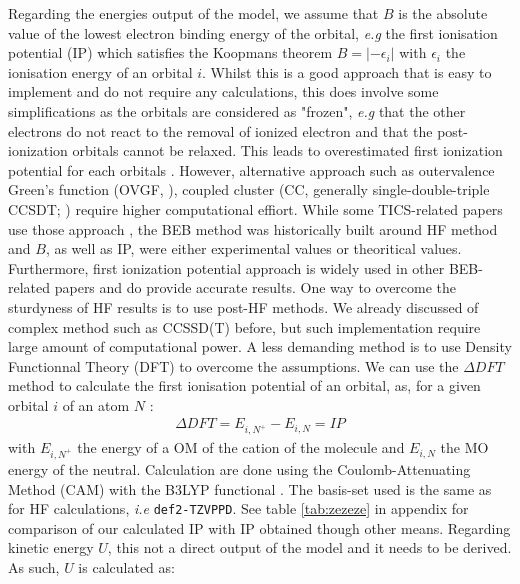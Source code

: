 \documentclass[twocolumn, a4paper, twoside,10pt]{scrartcl}
\begin{document}
Regarding the energies output of the model, we assume that $B$ is the absolute value of the lowest electron binding energy of the orbital, \textit{e.g} the first ionisation potential (IP) which satisfies the Koopmans theorem \citep{koopmansUberZuordnungWellenfunktionen1934} $B = |-\epsilon_i|$ with $\epsilon_i$ the ionisation energy of an orbital $i$. Whilst this is a good approach that is easy to implement and do not require any calculations, this does involve some simplifications as the orbitals are considered as "frozen", \textit{e.g} that the other electrons do not react to the removal of ionized electron and that the post-ionization orbitals cannot be relaxed. This leads to overestimated first ionization potential for each orbitals \citep{colonnaKoopmansCompliantFunctionalsPotentials2019, wangIonizaPotenJP102026,jesenekPartialIonisationCross2025}. However, alternative approach such as outervalence Green’s function (OVGF, \cite{vonniessenComputationalMethodsOneparticle1984}), coupled cluster (CC, generally single-double-triple CCSDT; \cite{cizekCorrelationProblemAtomic1966}) require higher computational effiort. While some TICS-related papers use those approach \citep{scottElectronImpactIonizationCross2005,gachesAstrochemistryLowenergyElectron2024}, the BEB method was historically built around HF method and $B$, as well as IP, were either experimental values or theoritical values. Furthermore, first ionization potential approach is widely used in other BEB-related papers \citep{aliElectronimpactTotalIonization1997, hwangNewModelElectronimpact1996, gravesEfficientCalculationElectron2021} and do provide accurate results.
One way to overcome the sturdyness of HF results is to use post-HF methods. We already discussed of complex method such as CCSSD(T) before, but such implementation require large amount of computational power. A less demanding method is to use Density Functionnal Theory (DFT) to overcome the assumptions. We can use the $\Delta DFT$ method to calculate the first ionisation potential of an orbital, as, for a given orbital $i$ of an atom $N$  \citep{wangFe3dOrbital2025}:
\begin{align}
    \Delta DFT = E_{i,N^+} - E_{i,N} = IP
\end{align}
with $E_{i,N^+}$ the energy of a OM of the cation of the molecule and $E_{i,N}$ the MO energy of the neutral. Calculation are done using the Coulomb-Attenuating Method (CAM) with the B3LYP functional \citep{yanaiNewHybridExchange2004}. The basis-set used is the same as for HF calculations, \textit{i.e} \verb|def2-TZVPPD|. See table \ref{tab:zezeze} in appendix for comparison of our calculated IP with IP obtained though other means. Regarding kinetic energy $U$, this not a direct output of the model and it needs to be derived. As such, $U$ is calculated as:
\end{document}
